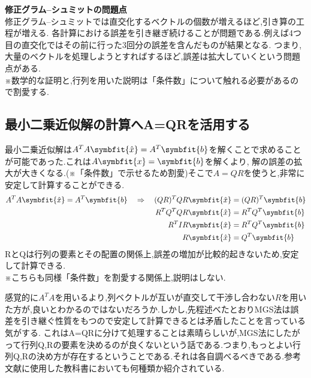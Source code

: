 \noindent
\textbf{修正グラム--シュミットの問題点}\\
\hspace{1em}
修正グラム--シュミットでは直交化するベクトルの個数が増えるほど,引き算の工程が増える.
各計算における誤差を引き継ぎ続けることが問題である.例えば4つ目の直交化ではその前に行った3回分の誤差を含んだものが結果となる.
つまり,大量のベクトルを処理しようとすればするほど,誤差は拡大していくという問題点がある.\\
※数学的な証明と,行列を用いた説明は「条件数」について触れる必要があるので割愛する.
\subsection{最小二乗近似解の計算へA=QRを活用する}
最小二乗近似解は$A^TA\symbfit{\hat{x}}=A^T\symbfit{b}$を解くことで求めることが可能であった.これは$A\symbfit{x}=\symbfit{b}$を解くより,
解の誤差の拡大が大きくなる.(※「条件数」で示せるため割愛)そこで$A=QR$を使うと,非常に安定して計算することができる.
\begin{align*}
A^TA\symbfit{\hat{x}}=A^T\symbfit{b} \quad \Rightarrow \quad(QR)^TQR\symbfit{\hat{x}} & =(QR)^T\symbfit{b}\\
                                                         R^T Q^T QR\symbfit{\hat{x}} & = R^T Q^T \symbfit{b}\\ 
                                                            R^T I R\symbfit{\hat{x}} & = R^TQ^T\symbfit{b} \\
                                                                  R\symbfit{\hat{x}} & = Q^T\symbfit{b}
\end{align*}
RとQは行列の要素とその配置の関係上,誤差の増加が比較的起きないため,安定して計算できる.\\\hspace{1em}※こちらも同様「条件数」を割愛する関係上,説明はしない.\medskip

感覚的に$A^TA$を用いるより,列ベクトルが互いが直交して干渉し合わない$R$を用いた方が,良いとわかるのではないだろうか.しかし,先程述べたとおりMGS法は誤差を引き継ぐ性質をもつので安定して計算できるとは矛盾したことを言っている気がする.
これはA=QRに分けて処理することは素晴らしいが,MGS法にしたがって行列Q,Rの要素を決めるのが良くないという話である.つまり,もっとよい行列Q,Rの決め方が存在するということである.それは各自調べるべきである.参考文献に使用した教科書においても何種類か紹介されている.

